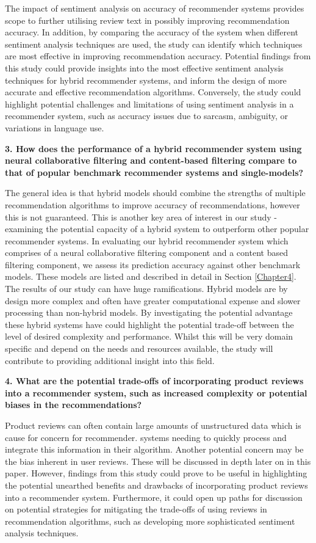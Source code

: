 The impact of sentiment analysis on accuracy of recommender systems provides scope to further utilising review text in possibly improving recommendation accuracy. In addition, by comparing the accuracy of the system when different sentiment analysis techniques are used, the study can identify which techniques are most effective in improving recommendation accuracy. Potential findings from this study could provide insights into the most effective sentiment analysis techniques for hybrid recommender systems, and inform the design of more accurate and effective recommendation algorithms. Conversely, the study could highlight potential challenges and limitations of using sentiment analysis in a recommender system, such as accuracy issues due to sarcasm, ambiguity, or variations in language use. 

\textbf{3. How does the performance of a hybrid recommender system using neural collaborative filtering and content-based filtering compare to that of popular benchmark recommender systems and single-models?}

The general idea is that hybrid models should combine the strengths of multiple recommendation algorithms to improve accuracy of recommendations, however this is not guaranteed. This is another key area of interest in our study - examining the potential capacity of a hybrid system to outperform other popular recommender systems. In evaluating our hybrid recommender system which comprises of a neural collaborative filtering component and a content based filtering component, we assess its prediction accuracy against other benchmark models. These models are listed and described in detail in Section \ref{Chapter4}.  The results of our study can have huge ramifications. Hybrid models are by design more complex and often have greater computational expense and slower processing than non-hybrid models. By investigating the potential advantage these hybrid systems have could highlight the potential trade-off between the level of desired complexity and performance. Whilst this will be very domain specific and depend on the needs and resources available, the study will contribute to providing additional insight into this field. 

\textbf{4. What are the potential trade-offs of incorporating product reviews into a recommender system, such as increased complexity or potential biases in the recommendations?}

Product reviews can often contain large amounts of unstructured data which is cause for concern for recommender. systems needing to quickly process and integrate this information in their algorithm. Another potential concern may be the bias inherent in user reviews. These will be discussed in depth later on in this paper. However, findings from this study could prove to be useful in highlighting the potential unearthed benefits and drawbacks of incorporating product reviews into a recommender system. Furthermore, it could open up paths for discussion on potential strategies for mitigating the trade-offs of using reviews in recommendation algorithms, such as developing more sophisticated sentiment analysis techniques. 

